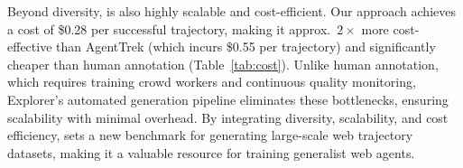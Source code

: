 Beyond diversity, \model is also highly scalable and cost-efficient.
Our approach achieves a cost of \$0.28 per successful trajectory, making it approx.\ $2\times$ more cost-effective than AgentTrek \cite{xu2024agenttrek} (which incurs \$0.55 per trajectory) and significantly cheaper than human annotation (Table~\ref{tab:cost}).
Unlike human annotation, which requires training crowd workers and continuous quality monitoring, Explorer’s automated generation pipeline eliminates these bottlenecks, ensuring scalability with minimal overhead.
By integrating diversity, scalability, and cost efficiency, \model sets a new benchmark for generating large-scale web trajectory datasets, making it a valuable resource for training generalist web agents.



